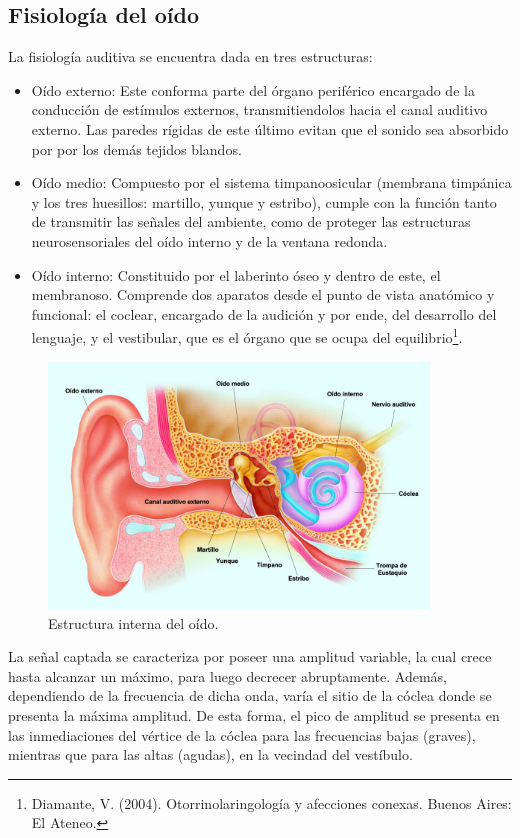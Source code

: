 \documentclass[a4paper]{article}
\begin{document}
\subsection{Fisiología del oído}

La fisiología auditiva se encuentra dada en tres estructuras:
\begin{itemize}
	\item Oído externo:
	Este conforma parte del órgano periférico encargado de la conducción de estímulos externos, transmitiendolos hacia el canal auditivo externo. Las paredes rígidas de este último evitan que el sonido sea absorbido por por los demás tejidos blandos.
	\item Oído medio:
	Compuesto por el sistema timpanoosicular (membrana timpánica y los tres huesillos: martillo, yunque y estribo), cumple con la función tanto de transmitir las señales del ambiente, como de proteger las estructuras neurosensoriales del oído interno y de la ventana redonda.
	\item Oído interno:
	Constituido por el laberinto óseo y dentro de este, el membranoso. Comprende dos aparatos desde el punto de vista anatómico y funcional: el coclear, encargado de la audición y por ende, del desarrollo del lenguaje, y el vestibular, que es el órgano que se ocupa del equilibrio\footnote{Diamante, V. (2004). Otorrinolaringología y afecciones conexas. Buenos Aires: El Ateneo.}.
\end{itemize}

\begin{figure}[H]
\centering
	\includegraphics[width=0.9\textwidth]{Imagenes/Partes-del-oido.png}
	\caption{Estructura interna del oído.}
	\label{fig:oido}
\end{figure}

La señal captada se caracteriza por poseer una amplitud variable, la cual crece hasta alcanzar un máximo, para luego decrecer abruptamente. Además, dependiendo de la frecuencia de dicha onda, varía el sitio de la cóclea donde se presenta la máxima amplitud. De esta forma, el pico de amplitud se presenta en las inmediaciones del vértice de la cóclea para las frecuencias bajas (graves), mientras que para las altas (agudas), en la vecindad del vestíbulo.
\end{document}
